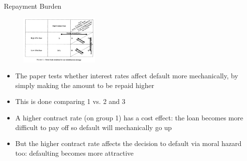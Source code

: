 \documentclass[11pt,notes=hide,aspectratio=169,mathserif]{beamer}
\begin{document}
\begin{frame}{Repayment Burden}
\begin{figure}
    \centering
    \includegraphics[width=0.35\textwidth]{inputs/main.png}
\end{figure}
\begin{itemize}
    \pause \item The paper tests whether interest rates affect default more mechanically, by simply making the amount to be repaid higher
    \pause  \item This is done comparing 1 vs. 2 and 3
    \pause \item A higher contract rate (on group 1) has a cost effect: the loan becomes more difficult to pay off so default will mechanically go up
    \pause \item But the higher contract rate affects the decision to default via moral hazard too: defaulting becomes more attractive
\end{itemize}
\end{frame}
\end{document}
